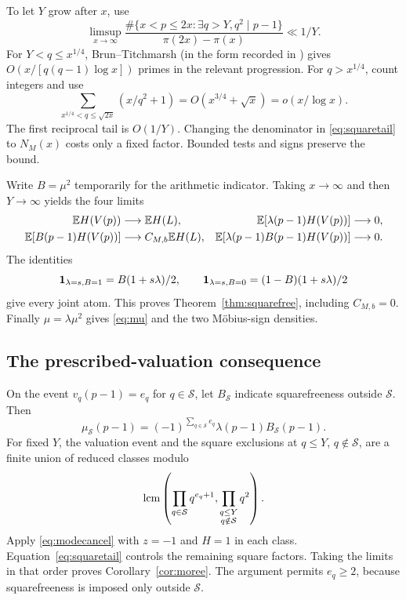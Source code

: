 To let $Y$ grow after $x$, use
\begin{equation}\label{eq:squaretail}
 \limsup_{x\to\infty}
 \frac{\#\{x<p\leq2x:\exists q>Y, q^2\mid p-1\}}
      {\pi(2x)-\pi(x)}\ll1/Y.
\end{equation}
For $Y<q\leq x^{1/4}$, Brun--Titchmarsh (in the form recorded in \cite{Ford}) gives
$O(x/[q(q-1)\log x])$ primes in the relevant progression.
For $q>x^{1/4}$, count integers and use
\[
 \sum_{x^{1/4}<q\leq\sqrt{2x}}(x/q^2+1)
       =O(x^{3/4}+\sqrt{x})=o(x/\log x).
\]
The first reciprocal tail is $O(1/Y)$.
Changing the denominator in \eqref{eq:squaretail} to $N_M(x)$
costs only a fixed factor. Bounded tests and signs preserve the bound.

Write $B=\mu^2$ temporarily for the arithmetic indicator.
Taking $x\to\infty$ and then $Y\to\infty$ yields the four limits
\begin{align*}
 \mathbb E H(V(p))&\longrightarrow\mathbb E H(L),&
 \mathbb E[\lambda(p-1)H(V(p))]&\longrightarrow0,\\
 \mathbb E[B(p-1)H(V(p))]&\longrightarrow C_{M,b}\mathbb E H(L),&
 \mathbb E[\lambda(p-1)B(p-1)H(V(p))]&\longrightarrow0.
\end{align*}
The identities
\[
 \mathbf 1_{\lambda=s,B=1}=B(1+s\lambda)/2,\qquad
 \mathbf 1_{\lambda=s,B=0}=(1-B)(1+s\lambda)/2
\]
give every joint atom. This proves Theorem~\ref{thm:squarefree},
including $C_{M,b}=0$. Finally $\mu=\lambda\mu^2$ gives
\eqref{eq:mu} and the two M\"obius-sign densities.

\subsection{The prescribed-valuation consequence}

On the event $v_q(p-1)=e_q$ for $q\in\mathcal S$, let
$B_{\mathcal S}$ indicate squarefreeness outside $\mathcal S$.
Then
\[
 \mu_{\mathcal S}(p-1)
       =(-1)^{\sum_{q\in\mathcal S}e_q}\lambda(p-1)B_{\mathcal S}(p-1).
\]
For fixed $Y$, the valuation event and the square exclusions at
$q\leq Y$, $q\notin\mathcal S$, are a finite union of reduced
classes modulo
\[
 \operatorname{lcm}\left(\prod_{q\in\mathcal S}q^{e_q+1},
           \prod_{\substack{q\leq Y\\q\notin\mathcal S}}q^2\right).
\]
Apply \eqref{eq:modecancel} with $z=-1$ and $H=1$ in each class.
Equation~\eqref{eq:squaretail} controls the remaining square factors.
Taking the limits in that order proves Corollary~\ref{cor:moree}.
The argument permits $e_q\geq2$, because squarefreeness is imposed
only outside $\mathcal S$.
